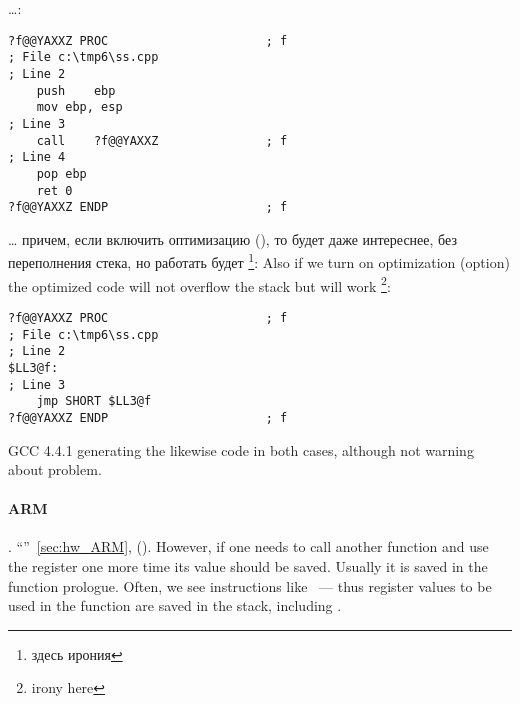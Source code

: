 \dots {}:

\begin{lstlisting}
?f@@YAXXZ PROC						; f
; File c:\tmp6\ss.cpp
; Line 2
	push	ebp
	mov	ebp, esp
; Line 3
	call	?f@@YAXXZ				; f
; Line 4
	pop	ebp
	ret	0
?f@@YAXXZ ENDP						; f
\end{lstlisting}

\dots \IFRU
{причем, если включить оптимизацию (\Ox), то будет даже интереснее, без переполнения стека, 
но работать будет \footnote{здесь ирония}:}
{Also if we turn on optimization (\Ox option) the optimized code will not overflow the stack 
but will work \footnote{irony here}:}

\begin{lstlisting}
?f@@YAXXZ PROC						; f
; File c:\tmp6\ss.cpp
; Line 2
$LL3@f:
; Line 3
	jmp	SHORT $LL3@f
?f@@YAXXZ ENDP						; f
\end{lstlisting}

{GCC 4.4.1 generating the likewise code in both cases, although not warning about problem.}

\paragraph{ARM}

.
 ``\HelloWorldSectionName''~\ref{sec:hw_ARM}, 
 \LR ().
{However, if one needs to call another function and use the \LR register
one more time its value should be saved}.
{Usually it is saved in the function prologue. Often, we see instructions like}
   ~--- 
{thus register values
to be used in the function are saved in the stack, including} \LR.

